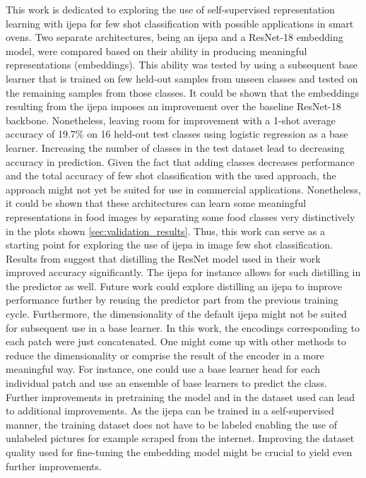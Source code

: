 This work is dedicated to exploring the use of self-supervised representation learning with \gls{ijepa} 
for few shot classification with possible applications in smart ovens. Two separate architectures, being 
an \gls{ijepa} and a ResNet-18 embedding model, were compared based on their ability in producing meaningful 
representations (embeddings). This ability was tested by using a subsequent base learner that is trained on 
few held-out samples from unseen classes and tested on the remaining samples from those classes. 
It could be shown that the embeddings resulting from the \gls{ijepa} imposes an improvement over the 
baseline ResNet-18 backbone. Nonetheless, leaving room for improvement with a 1-shot average accuracy of 19.7\% 
on 16 held-out test classes using logistic regression as a base learner. Increasing the number of classes 
in the test dataset lead to decreasing accuracy in prediction. Given the fact that adding classes decreases
performance and the total accuracy of few shot classification with the used approach, the approach might not yet 
be suited for use in commercial applications. Nonetheless, it could be shown that these architectures can 
learn some meaningful representations in food images by separating some food classes very distinctively in the plots shown 
\ref{sec:validation_results}. Thus, this work can serve as a starting point for exploring
the use of \gls{ijepa} in image few shot classification. Results from \cite{tian_rethinking_2020} suggest that 
distilling the ResNet model used in their work improved accuracy significantly. The \gls{ijepa} for instance allows
for such distilling in the predictor as well. Future work could explore distilling an \gls{ijepa} to improve performance
further by reusing the predictor part from the previous training cycle. Furthermore, the dimensionality of 
the default \gls{ijepa} might not be suited for subsequent use in a base learner. In this work, the encodings 
corresponding to each patch were just concatenated. One might come up with other methods to reduce the dimensionality
or comprise the result of the encoder in a more meaningful way. For instance, one could use a base learner 
head for each individual patch and use an ensemble of base learners to predict the class. 
Further improvements in pretraining the model and in the dataset used can lead to additional improvements. As the 
\gls{ijepa} can be trained in a self-supervised manner, the training dataset does not have to be labeled enabling 
the use of unlabeled pictures for example scraped from the internet. Improving the dataset quality used for fine-tuning 
the embedding model might be crucial to yield even further improvements.

